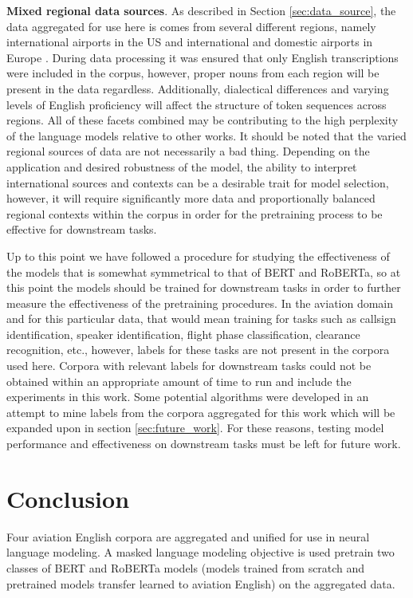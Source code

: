 \documentclass[12pt]{article}
\begin{document}
\textbf{Mixed regional data sources}. As described in Section \ref{sec:data_source}, the data aggregated for use here is comes from several different
regions, namely international airports in the US \cite{godfrey_air_1994} and international and domestic airports in Europe
\cite{smidl_air_2019,hofbauer_atcosim_2008,szoke_detecting_2021}. During data processing it was ensured that only English transcriptions were included
in the corpus, however, proper nouns from each region will be present in the data regardless. Additionally, dialectical differences and varying levels
of English proficiency will affect the structure of token sequences across regions. All of these facets combined may be contributing to the high
perplexity of the language models relative to other works. It should be noted that the varied regional sources of data are not necessarily a bad
thing. Depending on the application and desired robustness of the model, the ability to interpret international sources and contexts can be a
desirable trait for model selection, however, it will require significantly more data and proportionally balanced regional contexts within the corpus
in order for the pretraining process to be effective for downstream tasks.

Up to this point we have followed a procedure for studying the effectiveness of the models that is somewhat symmetrical to that of BERT and RoBERTa,
so at this point the models should be trained for downstream tasks in order to further measure the effectiveness of the pretraining procedures.
In the aviation domain and for this particular data, that would mean training for tasks such as callsign identification, speaker identification,
flight phase classification, clearance recognition, etc., however, labels for these tasks are not present in the corpora used here. Corpora with
relevant labels for downstream tasks could not be obtained within an appropriate amount of time to run and include the experiments in this work.
Some potential algorithms were developed in an attempt to mine labels from the corpora aggregated for this work which will be expanded upon in section
\ref{sec:future_work}. For these reasons, testing model performance and effectiveness on downstream tasks must be left for future work.

\section{Conclusion}\label{sec:conclusion}
Four aviation English corpora are aggregated and unified for use in neural language modeling. A masked language modeling objective is used pretrain
two classes of BERT and RoBERTa models (models trained from scratch and pretrained models transfer learned to aviation English) on the aggregated
data.
\end{document}
